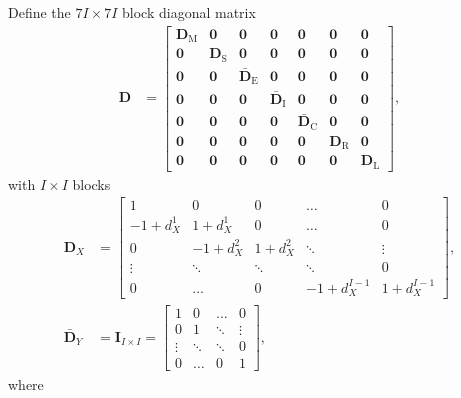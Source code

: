 \documentclass{article}
\newcommand{\mat}[1]{\mathbf{#1}}
\begin{document}
Define the $7 I \times 7 I$ block diagonal matrix
\begin{align}
  \mat{D} &=
  \begin{bmatrix}
    \mat{D}_{\mathrm{M}} & \mat{0} & \mat{0} &
    \mat{0} & \mat{0} & \mat{0} & \mat{0}
    \\
    \mat{0} & \mat{D}_{\mathrm{S}} & \mat{0} &
    \mat{0} & \mat{0} & \mat{0} & \mat{0}
    \\
    \mat{0} & \mat{0} & \bar{\mat{D}}_{\mathrm{E}} &
    \mat{0} & \mat{0} & \mat{0} & \mat{0}
    \\
    \mat{0} & \mat{0} & \mat{0} &
    \bar{\mat{D}}_{\mathrm{I}} & \mat{0} & \mat{0} & \mat{0}
    \\
    \mat{0} & \mat{0} & \mat{0} & \mat{0} &
    \bar{\mat{D}}_{\mathrm{C}} & \mat{0} & \mat{0}
    \\
    \mat{0} & \mat{0} & \mat{0} & \mat{0} &
    \mat{0} & \mat{D}_{\mathrm{R}} & \mat{0}
    \\
    \mat{0} & \mat{0} & \mat{0} & \mat{0} &
    \mat{0} & \mat{0} & \mat{D}_{\mathrm{L}}
  \end{bmatrix},
\end{align}
with $I \times I$ blocks
\begin{subequations}
  \begin{align}
    \mat{D}_X &=
    \begin{bmatrix}
      1 & 0 & 0 & \hdots & 0
      \\
      - 1 + d_X^1 & 1 + d_X^1 & 0 & \hdots & 0
      \\
      0 & - 1 + d_X^2 & 1 + d_X^2 & \ddots & \vdots
      \\
      \vdots & \ddots & \ddots & \ddots & 0
      \\
      0 & \hdots & 0 & - 1 + d_X^{I - 1} & 1 + d_X^{I - 1}
    \end{bmatrix},
    \\
    \bar{\mat{D}}_Y &=
    \mat{I}_{I \times I} =
    \begin{bmatrix}
      1 & 0 & \hdots & 0 \\
      0 & 1 & \ddots & \vdots \\
      \vdots & \ddots & \ddots & 0 \\
      0 & \hdots & 0 & 1
    \end{bmatrix},
  \end{align}
\end{subequations}
where
\end{document}
